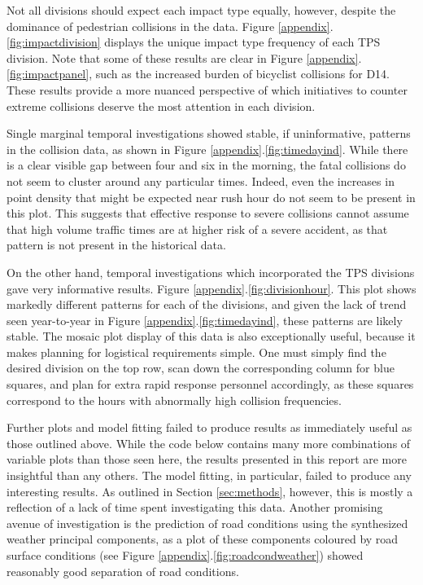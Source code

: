 \documentclass{article}
\begin{document}
Not all divisions should expect each impact type equally, however, despite the dominance of pedestrian collisions in the data. Figure
\ref{appendix}.\ref{fig:impactdivision} displays the unique impact type frequency of each TPS division. Note that some of these results
are clear in Figure \ref{appendix}.\ref{fig:impactpanel}, such as the increased burden of bicyclist collisions for D14. These
results provide a more nuanced perspective of which initiatives to counter extreme collisions deserve the most attention in each
division.

Single marginal temporal investigations showed stable, if uninformative, patterns in the collision data, as shown in Figure
\ref{appendix}.\ref{fig:timedayind}. While there is a clear visible gap between four and six in the morning, the fatal collisions
do not seem to cluster around any particular times. Indeed, even the increases in point density that might be expected near rush hour do not seem
to be present in this plot. This suggests that effective response to severe collisions cannot assume that high volume traffic times
are at higher risk of a severe accident, as that pattern is not present in the historical data.

On the other hand, temporal investigations which incorporated the TPS divisions gave very informative results. Figure
\ref{appendix}.\ref{fig:divisionhour}. This plot shows markedly different patterns for each of the divisions, and given the lack
of trend seen year-to-year in Figure \ref{appendix}.\ref{fig:timedayind}, these patterns are likely stable. The mosaic plot display of
this data is also exceptionally useful, because it makes planning for logistical requirements simple. One must simply find the desired
division on the top row, scan down the corresponding column for blue squares, and plan for extra rapid response personnel accordingly, as these
squares correspond to the hours with abnormally high collision frequencies.

Further plots and model fitting failed to produce results as immediately useful as those outlined above. While the code below
contains many more combinations of variable plots than those seen here, the results presented in this report are more insightful
than any others. The model fitting, in particular, failed to produce any interesting results. As outlined in Section
\ref{sec:methods}, however, this is mostly a reflection of a lack of time spent investigating this data. Another promising avenue of
investigation is the prediction of road conditions using the synthesized weather principal components, as a plot of these
components coloured by road surface conditions (see Figure \ref{appendix}.\ref{fig:roadcondweather}) showed reasonably good
separation of road conditions.
\end{document}
